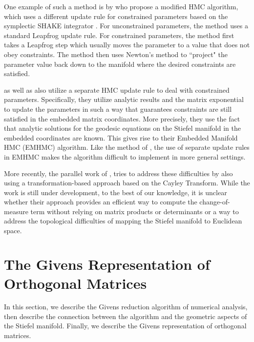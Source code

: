 \documentclass[ba]{imsart}
\numberwithin{equation}{section}
\theoremstyle{plain}
\begin{document}
\noindent One example of such a method is by \cite{brubaker2012family} who propose a modified HMC algorithm, which uses a different update rule for constrained parameters based on the symplectic SHAKE integrator \citep{leimkuhler2004simulating}. For unconstrained parameters, the method uses a standard Leapfrog update rule. For constrained parameters, the method first takes a Leapfrog step which usually moves the parameter to a value that does not obey constraints. The method then uses Newton's method to ``project" the parameter value back down to the manifold where the desired constraints are satisfied.

\noindent \citet{byrne2013geodesic} as well as \citet{holbrook2016bayesian} also utilize a separate HMC update rule to deal with constrained parameters. Specifically, they utilize analytic results and the matrix exponential to update the parameters in such a way that guarantees constraints are still satisfied in the embedded matrix coordinates. More precisely, they use the fact that analytic solutions for the geodesic equations on the Stiefel manifold in the embedded coordinates are known. This gives rise to their Embedded Manifold HMC (EMHMC) algorithm. Like the method of \cite{brubaker2012family}, the use of separate update rules in EMHMC makes the algorithm difficult to implement in more general settings.

\noindent More recently, the parallel work of \cite{jauch2018random}, tries to address these difficulties by also using a transformation-based approach based on the Cayley Transform. While the work is still under development, to the best of our knowledge, it is unclear whether their approach provides an efficient way to compute the change-of-measure term without relying on matrix products or determinants or a way to address the topological difficulties of mapping the Stiefel manifold to Euclidean space.

\section{The Givens Representation of Orthogonal Matrices} \label{Givens}
In this section, we describe the Givens reduction algorithm of numerical analysis, then describe the connection between the algorithm and the geometric aspects of the Stiefel manifold. Finally, we describe the Givens representation of orthogonal matrices.
\end{document}
